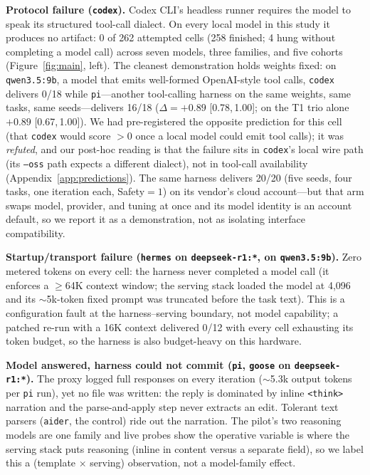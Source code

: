 \documentclass[10pt]{article}
\newcommand{\ci}[2]{[#1,\,#2]}
\begin{document}
\textbf{Protocol failure (\texttt{codex}).} Codex CLI's headless runner requires the model to speak
its structured tool-call dialect. On every local model in this study it produces no artifact: 0 of
262 attempted cells (258 finished; 4 hung without completing a model call) across seven models, three
families, and five cohorts (Figure~\ref{fig:main}, left). The cleanest demonstration holds weights
fixed: on \texttt{qwen3.5:9b}, a model that emits well-formed OpenAI-style tool calls, \texttt{codex}
delivers 0/18 while \texttt{pi}---another tool-calling harness on the same weights, same tasks, same
seeds---delivers 16/18 ($\Delta{=}{+}0.89$ \ci{0.78}{1.00}; on the T1 trio alone $+0.89$
\ci{0.67}{1.00}). We had pre-registered the opposite prediction for this cell (that \texttt{codex}
would score $>0$ once a local model could emit tool calls); it was \emph{refuted}, and our
post-hoc reading is that the failure sits in \texttt{codex}'s local wire path (its \texttt{--oss}
path expects a different dialect), not in tool-call availability
(Appendix~\ref{app:predictions}). The same harness delivers 20/20 (five seeds, four tasks, one
iteration each, Safety$=1$) on its vendor's cloud account---but that arm swaps model, provider, and
tuning at once and its model identity is an account default, so we report it as a demonstration,
not as isolating interface compatibility.

\textbf{Startup/transport failure (\texttt{hermes} on \texttt{deepseek-r1:*}, on
\texttt{qwen3.5:9b}).} Zero metered tokens on every cell: the harness never completed a model call
(it enforces a $\geq$64K context window; the serving stack loaded the model at 4{,}096 and its
$\sim$5k-token fixed prompt was truncated before the task text). This is a configuration fault at
the harness--serving boundary, not model capability; a patched re-run with a 16K context delivered
0/12 with every cell exhausting its token budget, so the harness is also budget-heavy on this
hardware.

\textbf{Model answered, harness could not commit (\texttt{pi}, \texttt{goose} on
\texttt{deepseek-r1:*}).} The proxy logged full responses on every iteration ($\sim$5.3k output
tokens per \texttt{pi} run), yet no file was written: the reply is dominated by inline
\texttt{<think>} narration and the parse-and-apply step never extracts an edit. Tolerant text
parsers (\texttt{aider}, the control) ride out the narration. The pilot's two reasoning models are
one family and live probes show the operative variable is where the serving stack puts reasoning
(inline in content versus a separate field), so we label this a (template $\times$ serving)
observation, not a model-family effect.
\end{document}
